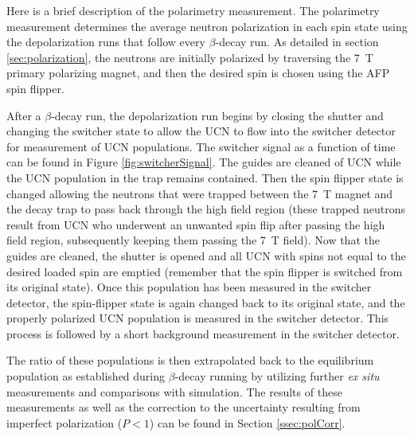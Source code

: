 Here is a brief description of the polarimetry measurement.
The polarimetry measurement determines the average neutron polarization in each spin state using
the depolarization runs that follow every $\beta$-decay run. As detailed in section
\ref{sec:polarization}, the neutrons are initially polarized by traversing the 7~T primary
polarizing magnet, and then the desired spin is chosen using the AFP spin flipper.

After a $\beta$-decay run, the depolarization run begins by closing the shutter and changing the switcher
state to allow
the UCN to flow into the switcher detector for measurement of UCN populations. The switcher signal
as a function of time can be found in Figure \ref{fig:switcherSignal}. The guides are cleaned of UCN while
the UCN population in the trap remains contained. Then the spin flipper state is changed allowing the
neutrons that were trapped between the 7~T magnet and the decay trap to pass back through the high
field region (these trapped neutrons result from UCN who underwent an unwanted spin flip after passing
the high field region, subsequently keeping them passing the 7~T field). Now that the guides are cleaned,
the shutter is opened and all UCN with spins not equal to the desired loaded spin are emptied (remember that
the spin flipper is switched from its original state). Once this population has been measured in the
switcher detector, the spin-flipper state is again changed back to its original state, and the
properly polarized UCN population is measured in the switcher detector. This process is followed by a short
background measurement in the switcher detector.

The ratio of these populations is then extrapolated back to the equilibrium population as established
during $\beta$-decay running by utilizing further \textit{ex situ} measurements and comparisons with
simulation. The results of these measurements as well as the correction to the uncertainty resulting
from imperfect polarization ($P<1$) can be found in Section \ref{ssec:polCorr}.





